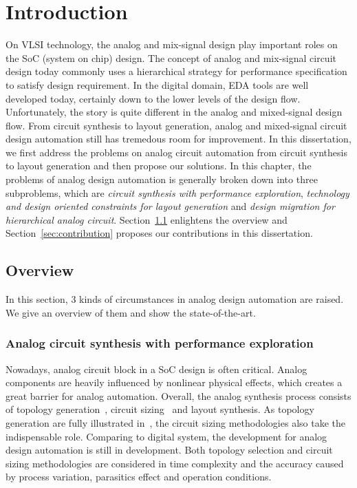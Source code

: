 \chapter{Introduction}\label{chap:Intro}

  On VLSI technology, the analog and mix-signal design play important roles on the SoC (system on chip) design. The concept of analog and mix-signal circuit design today commonly uses a hierarchical strategy for performance specification~\cite{CADonAMSIC_GG-ProcIEEE2000} to satisfy design requirement. In the digital domain, EDA tools are well developed today, certainly down to the lower levels of the design flow. Unfortunately, the story is quite different in the analog and mixed-signal design flow. From circuit synthesis to layout generation, analog and mixed-signal circuit design automation still has tremedous room for improvement. In this dissertation, we first address the problems on analog circuit automation from circuit synthesis to layout generation and then propose our solutions. In this chapter, the problems of analog design automation is generally broken down into three subproblems, which are {\it circuit synthesis with performance exploration}, {\it technology and design oriented constraints for layout generation} and {\it design migration for hierarchical analog circuit}. Section~\ref{sec:overview} enlightens the overview and Section~\ref{sec:contribution} proposes our contributions in this dissertation. 

  \section{Overview}\label{sec:overview}

    In this section, 3 kinds of circumstances in analog design automation are raised. We give an overview of them and show the state-of-the-art. 

    \subsection{Analog circuit synthesis with performance exploration}\label{subsec:PAGEOverview}

      Nowadays, analog circuit block in a SoC design is often critical. Analog components are heavily influenced by nonlinear physical effects, which creates a great barrier for analog automation. Overall, the analog synthesis process consists of topology generation~\cite{TopoSel_ICCAD2008,IPTopoSel_TCAD1995,CAFFEINE_DATE2005}, circuit sizing~\cite{MARS_TCAD2012} and layout synthesis. As topology generation are fully illustrated in~\cite{TopoSel_ICCAD2008,IPTopoSel_TCAD1995,CAFFEINE_DATE2005}, the circuit sizing methodologies also take the indispensable role. Comparing to digital system, the development for analog design automation is still in development. Both topology selection and circuit sizing methodologies are considered in time complexity and the accuracy caused by process variation, parasitics effect and operation conditions.

